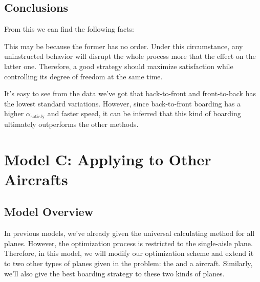 \documentclass{article}
\theoremstyle{definition}
\theoremstyle{remark}
\numberwithin{equation}{section}
\begin{document}
	\subsection{Conclusions}
	From this we can find the following facts:
	\begin{enumerate}

		This may be because the former has no order. Under this circumstance, any uninstructed behavior will disrupt the whole process more that the effect on the latter one. Therefore, a good strategy should maximize satisfaction while controlling its degree of freedom at the same time.

		It's easy to see from the data we've got that back-to-front and front-to-back has the lowest standard variations. However, since back-to-front boarding has a higher \(\alpha_{\mathrm{satisfy}}\) and faster speed, it can be inferred that this kind of boarding ultimately outperforms the other methods.
	\end{enumerate}

	\section{Model C: Applying to Other Aircrafts}


	\subsection{Model Overview}
	In previous models, we've already given the universal calculating method for all planes. However, the optimization process is restricted to the single-aisle plane. Therefore, in this model, we will modify our optimization scheme and extend it to two other types of planes given in the problem: the  and a  aircraft. Similarly, we'll also give the best boarding strategy to these two kinds of planes.
\end{document}
